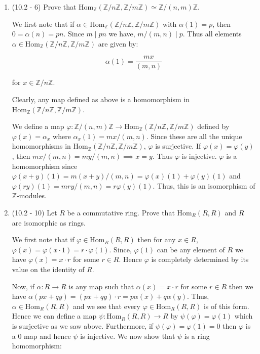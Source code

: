 \documentclass[12pt]{article}
\newcommand{\mz}{\mathbb{Z}}
\renewcommand{\hom}[1]{\text{Hom}_{#1}}
\begin{document}
\begin{enumerate}
\item (10.2 - 6) Prove that $\hom{\mz}(\mz/n\mz, \mz/m\mz)
\simeq \mz/(n, m)\mz$.

\begin{mybox}
    We first note that if
    $\alpha\in\hom{\mz}(\mz/n\mz, \mz/m\mz)$ with $\alpha(1)
    =p$, then $0=\alpha(n)=pn$. Since $m\mid pn$ we have,
    $m/(m,n)\mid p$. Thus all elements $\alpha\in 
    \hom{\mz}(\mz/n\mz, \mz/m\mz)$ are given by:

    $$\alpha(1)=\frac{mx}{(m,n)}$$

    for $x\in \mz/n\mz$.
    
    Clearly, any map defined as above
    is a homomorphism in $\hom{\mz}(\mz/n\mz, \mz/m\mz)$.

    \vspace*{2mm}
    We define a map $\varphi:\mz/(n, m)\mz
    \longrightarrow \hom{\mz}(\mz/n\mz, \mz/m\mz)$
    defined by $\varphi(x)=\alpha_x$ where $\alpha_x(1)
    =mx/(m,n)$. Since these are all the unique
    homomorphisms in $\hom{\mz}(\mz/n\mz, \mz/m\mz)$,
    $\varphi$ is surjective. If $\varphi(x)=\varphi(y)$,
    then $mx/(m,n)=my/(m,n)\implies x=y$. Thus $\varphi$
    is injective. $\varphi$ is a homomorphism since
    $\varphi(x+y)(1)=m(x+y)/(m,n)=\varphi(x)(1)
    +\varphi(y)(1)$ and $\varphi(ry)(1)=mry/(m,n)
    =r\varphi(y)(1)$.
    Thus, this is an isomorphism of
    $\mz$-modules.
\end{mybox}

\item (10.2 - 10) Let $R$ be a commutative ring. Prove
that $\hom{R}(R, R)$ and $R$ are isomorphic as rings.
\begin{mybox}
    We first note that if $\varphi\in\hom{R}(R,R)$ then
    for any $x\in R$, $\varphi(x)=\varphi(x\cdot 1)=r\cdot
    \varphi(1)$. Since, $\varphi(1)$ can be any element of
    $R$ we have $\varphi(x)=x\cdot r$ for some $r\in R$.
    Hence $\varphi$ is completely determined
    by its value on the identity of $R$.

    \vspace*{2mm}
    Now, if $\alpha:R\to R$ is any map such that $\alpha
    (x)=x\cdot r$ for some $r\in R$ then we have
    $\alpha(p x+q y)=(px+qy)\cdot r=p\alpha(x)+q\alpha(y).$
    Thus, $\alpha\in\hom{R}(R,R)$ and we see that every
    $\varphi\in\hom{R}(R,R)$ is of this form. Hence we can
    define a map $\psi:\hom{R}(R,R)\to R$ by $\psi(\varphi)
    =\varphi(1)$ which is surjective as we saw above.
    Furthermore, if $\psi(\varphi)=\varphi(1)=0$ then
    $\varphi$ is a 0 map and hence $\psi$ is injective.
    We now show that $\psi$ is a ring homomorphism:


\end{mybox}
\end{enumerate}
\end{document}
